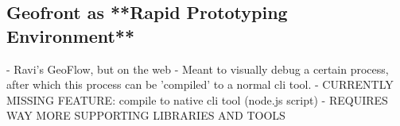 

\subsection{Geofront as **Rapid Prototyping Environment**} 
  - Ravi's GeoFlow, but on the web
    - Meant to visually debug a certain process, after which this process can be 'compiled' to a normal cli tool.
  - CURRENTLY MISSING FEATURE: compile to native cli tool (node.js script)
  - REQUIRES WAY MORE SUPPORTING LIBRARIES AND TOOLS

